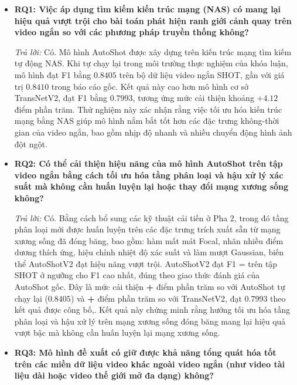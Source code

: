 \begin{itemize}
    \item \textbf{RQ1: Việc áp dụng tìm kiếm kiến trúc mạng (NAS) có mang lại hiệu quả vượt trội cho bài toán phát hiện ranh giới cảnh quay trên video ngắn so với các phương pháp truyền thống không?}
    
    \textit{Trả lời:} Có. Mô hình AutoShot được xây dựng trên kiến trúc mạng tìm kiếm tự động NAS. Khi tự chạy lại trong môi trường thực nghiệm của khóa luận, mô hình đạt F1 bằng $0.8405$ trên bộ dữ liệu video ngắn SHOT, gần với giá trị $0.8410$ trong báo cáo gốc. Kết quả này cao hơn mô hình cơ sở TransNetV2, đạt F1 bằng $0.7993$, tương ứng mức cải thiện khoảng $+4.12$ điểm phần trăm. Thử nghiệm này xác nhận rằng việc tối ưu hóa kiến trúc mạng bằng NAS giúp mô hình nắm bắt tốt hơn các đặc trưng không-thời gian của video ngắn, bao gồm nhịp độ nhanh và nhiều chuyển động hình ảnh đột ngột.

    \item \textbf{RQ2: Có thể cải thiện hiệu năng của mô hình AutoShot trên tập video ngắn bằng cách tối ưu hóa tầng phân loại và hậu xử lý xác suất mà không cần huấn luyện lại hoặc thay đổi mạng xương sống không?}
    
    \textit{Trả lời:} Có. Bằng cách bổ sung các kỹ thuật cải tiến ở Pha 2, trong đó tầng phân loại mới được huấn luyện trên các đặc trưng trích xuất sẵn từ mạng xương sống đã đóng băng, bao gồm: hàm mất mát Focal, nhãn nhiều điểm dương thích ứng, hiệu chỉnh nhiệt độ xác suất và làm mượt Gaussian, biến thể AutoShotV2 đạt hiệu năng vượt trội. AutoShotV2 đạt F1 = \textbf{\ASVTwoBestShotFOne{}} trên tập SHOT ở ngưỡng cho F1 cao nhất, đúng theo giao thức đánh giá của AutoShot gốc. Đây là mức cải thiện \textbf{+\ASVTwoBestVsAutoShotShotPP{}} điểm phần trăm so với AutoShot tự chạy lại ($0.8405$) và \textbf{+\ASVTwoBestVsTransNetShotPP{}} điểm phần trăm so với TransNetV2, đạt $0.7993$ theo kết quả được công bố,. Kết quả này chứng minh rằng hướng tối ưu hóa tầng phân loại và hậu xử lý trên mạng xương sống đóng băng mang lại hiệu quả vượt bậc mà không cần huấn luyện lại mạng xương sống.

    \item \textbf{RQ3: Mô hình đề xuất có giữ được khả năng tổng quát hóa tốt trên các miền dữ liệu video khác ngoài video ngắn (như video tài liệu dài hoặc video thế giới mở đa dạng) không?}
    

\end{itemize}
